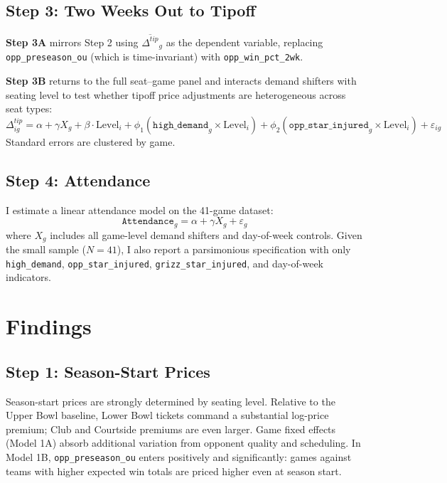 \documentclass[12pt]{article}
\begin{document}
\subsection{Step 3: Two Weeks Out to Tipoff}
 
\textbf{Step 3A} mirrors Step 2 using $\overline{\Delta^{tip}}_g$ as the dependent variable, replacing \texttt{opp\_preseason\_ou} (which is time-invariant) with \texttt{opp\_win\_pct\_2wk}.
 
\textbf{Step 3B} returns to the full seat--game panel and interacts demand shifters with seating level to test whether tipoff price adjustments are heterogeneous across seat types:
\begin{equation}
    \Delta^{tip}_{ig} = \alpha + \gamma X_g + \beta \cdot \text{Level}_i
    + \phi_1 (\texttt{high\_demand}_g \times \text{Level}_i)
    + \phi_2 (\texttt{opp\_star\_injured}_g \times \text{Level}_i) + \varepsilon_{ig}
\end{equation}
Standard errors are clustered by game.
 
\subsection{Step 4: Attendance}
 
I estimate a linear attendance model on the 41-game dataset:
\begin{equation}
    \texttt{Attendance}_g = \alpha + \gamma X_g + \varepsilon_g
\end{equation}
where $X_g$ includes all game-level demand shifters and day-of-week controls. Given the small sample ($N = 41$), I also report a parsimonious specification with only \texttt{high\_demand}, \texttt{opp\_star\_injured}, \texttt{grizz\_star\_injured}, and day-of-week indicators.
 
 
\section{Findings}
\label{sec:findings}
 
\subsection{Step 1: Season-Start Prices}
 
Season-start prices are strongly determined by seating level. Relative to the Upper Bowl baseline, Lower Bowl tickets command a substantial log-price premium; Club and Courtside premiums are even larger. Game fixed effects (Model 1A) absorb additional variation from opponent quality and scheduling. In Model 1B, \texttt{opp\_preseason\_ou} enters positively and significantly: games against teams with higher expected win totals are priced higher even at season start.
 
\end{document}

